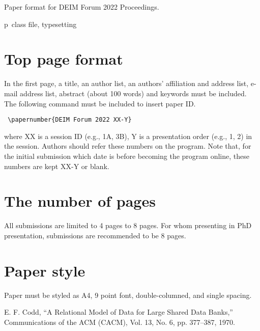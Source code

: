 \documentclass{deime}
\begin{document}
\pagestyle{empty}
\begin{eabstract}
Paper format for DEIM Forum 2022 Proceedings.
\end{eabstract}
\begin{ekeyword}
p\LaTeXe\ class file, typesetting
\end{ekeyword}
\maketitle

\section{Top page format}

In the first page, a title, an author list, an authors' affiliation and address list,
e-mail address list, abstract (about 100 words) and keywords must be included.
The following command must be included to insert paper ID.
\begin{verbatim}
 \papernumber{DEIM Forum 2022 XX-Y}
\end{verbatim}
where XX is a session ID (e.g., 1A, 3B), Y is a presentation order (e.g., 1, 2)
in the session.
Authors should refer these numbers on the program. 
Note that, for the initial submission which date is before becoming the program online,
these numbers are kept XX-Y or blank.  

\section{The number of pages}

All submissions are limited to 4 pages to 8 pages.
For whom presenting in PhD presentation, submissions are recommended to be 8 pages.

\section{Paper style}

Paper must be styled as A4, 9 point font, double-columned, and single spacing.

\vspace{2em}

\begin{thebibliography}{99}
  E. F. Codd, 
  ``A Relational Model of Data for Large Shared Data Banks,''
  Communications of the {ACM} (CACM), Vol. 13, No. 6, pp. 377--387, 1970.
\end{thebibliography}
\end{document}
